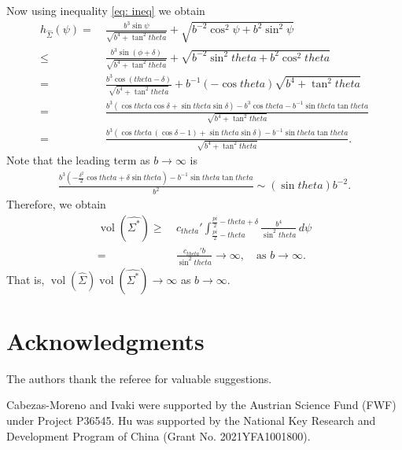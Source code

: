 \documentclass[12pt]{amsart}
\def\theta{theta}%
\def\pi{pi}%
\numberwithin{equation}{section}
\newcommand{\wh}{\widehat}
\newcommand{\8}{\infty}
\newcommand{\de}{\delta}
\newcommand{\Si}{\Sigma}
\DeclareMathOperator{\vol}{vol}
\renewcommand{\(}{\left(}
\renewcommand{\)}{\right)}
\newcommand{\eq}[1]{\begin{equation}\begin{alignedat}{2} #1 \end{alignedat}\end{equation}}
\newcommand{\ra}{\rightarrow}
\begin{document}
Now using inequality \eqref{eq: ineq} we obtain
\eq{
h_{\wh{\Si}}(\psi)= &~\frac{b^3 \sin \psi}{\sqrt{b^4+\tan^2\theta}}+\sqrt{b^{-2}\cos^2 \psi+b^2\sin^2 \psi}\\
\leq &~\frac{b^3 \sin(\phi+\de)}{\sqrt{b^4+\tan^2\theta}}+\sqrt{b^{-2}\sin^2 \theta+b^2\cos^2 \theta}\\
=&~\frac{b^3 \cos(\theta-\de)}{\sqrt{b^4+\tan^2\theta}}+b^{-1}(-\cos\theta)\sqrt{b^4+\tan^2 \theta} \\
=&~\frac{b^3(\cos\theta\cos\de+\sin\theta \sin\de)-b^3\cos\theta-b^{-1}\sin\theta\tan\theta}{\sqrt{b^4+\tan^2\theta}}\\
= &~\frac{b^3(\cos\theta \,(\cos\de-1)+\sin\theta\sin\de)-b^{-1}\sin\theta\tan\theta}{\sqrt{b^4+\tan^2\theta}}.
}
Note that the leading term as $b\to \infty$ is
\eq{
\frac{b^3(-\frac{\de^2}{2}\cos\theta+\de\sin\theta )-b^{-1}\sin\theta\tan\theta}{b^2}\sim (\sin\theta) b^{-2}.
}
Therefore, we obtain
\eq{
\vol(\wh{\Si^{\ast}})\geq &~ c_{\theta}'\int_{\frac{\pi}{2}-\theta}^{\frac{\pi}{2}-\theta+\de}\frac{ b^{4}}{\sin^2\theta} \, d\psi \\
 =&~ \frac{c_{\theta}' b}{\sin^2\theta}  \ra \infty, \quad \text{as $b \ra \infty$}.
}
That is, $\vol(\wh{\Si}) \vol(\wh{\Si^{\ast}})  \ra \infty$ as $b \ra \infty$.



\section*{Acknowledgments}

The authors thank the referee for valuable suggestions.


Cabezas-Moreno and Ivaki were supported by the Austrian Science Fund (FWF) under Project P36545. Hu was supported by the National Key Research and Development Program of China (Grant No. 2021YFA1001800).
\end{document}
